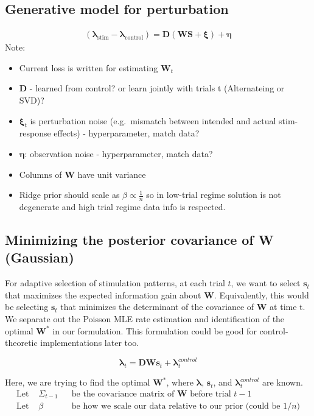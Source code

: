 \documentclass[11pt,letterpaper]{article} %
\begin{document}
\subsection*{Generative model for perturbation}
\begin{align*}
(\boldsymbol{\lambda}_{\text{stim}}-\boldsymbol{\lambda}_{\text{control}})=\mathbf{D}(\mathbf{WS}+\boldsymbol{\xi})+\boldsymbol{\eta}
\end{align*}
Note:
\begin{itemize}
\item Current loss is written for estimating $\mathbf{W}_t$
\item $\mathbf{D}$ - learned from control? or learn jointly with trials t (Alternateing or SVD)?
\item $\boldsymbol{\xi}_t$ is perturbation noise (e.g.\ mismatch between intended and actual stim-response effects) - hyperparameter, match data?
\item $\boldsymbol{\eta}$: observation noise - hyperparameter, match data?
\item Columns of $\mathbf{W}$ have unit variance
\item Ridge prior should scale as $\beta \propto \frac{1}{n}$ so in low-trial regime solution is not degenerate and high trial regime data info is respected.
\end{itemize}
\clearpage
\subsection*{Minimizing the posterior covariance of W (Gaussian)}
For adaptive selection of stimulation patterns, at each trial $t$, we want to select $\mathbf{s}_{t}$ that maximizes the expected information gain about $\mathbf{W}$. Equivalently, this would be selecting $\mathbf{s}_{t}$ that minimizes the determinant of the covariance of $\mathbf{W}$ at time t. We separate out the Poisson MLE rate estimation and identification of the optimal $\mathbf{W}^*$ in our formulation. This formulation could be good for control-theoretic implementations later too.

\begin{equation*}
    \boldsymbol{\lambda}_t =\mathbf{DWs}_t+\boldsymbol{\lambda}^{control}_{t}
\end{equation*}

Here, we are trying to find the optimal $\mathbf{W}^*$, where $\boldsymbol{\lambda}$, $\mathbf{s}_t$, and $\boldsymbol{\lambda}^{control}_{t}$ are known.
\begin{align*}
    \text{Let } & \Sigma_{t-1}
    && \text{be the covariance matrix of $\mathbf{W}$ before trial $t-1$}\\
    \text{Let } & \beta
    && \text{be how we scale our data relative to our prior (could be $1/n$)}
\end{align*}
\end{document}
